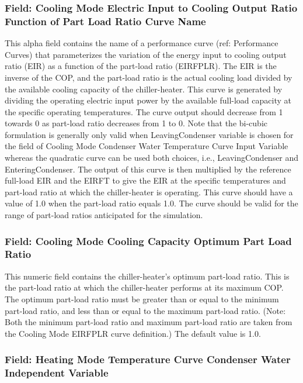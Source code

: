 \subsubsection{Field: Cooling Mode Electric Input to Cooling Output Ratio Function of Part Load Ratio Curve Name}\label{field-cooling-mode-electric-input-to-cooling-output-ratio-function-of-part-load-ratio-curve-name}

This alpha field contains the name of a performance curve (ref: Performance Curves) that parameterizes the variation of the energy input to cooling output ratio (EIR) as a function of the part-load ratio (EIRFPLR). The EIR is the inverse of the COP, and the part-load ratio is the actual cooling load divided by the available cooling capacity of the chiller-heater. This curve is generated by dividing the operating electric input power by the available full-load capacity at the specific operating temperatures. The curve output should decrease from 1 towards 0 as part-load ratio decreases from 1 to 0. Note that the bi-cubic formulation is generally only valid when LeavingCondenser variable is chosen for the field of Cooling Mode Condenser Water Temperature Curve Input Variable whereas the quadratic curve can be used both choices, i.e., LeavingCondenser and EnteringCondenser. The output of this curve is then multiplied by the reference full-load EIR and the EIRFT to give the EIR at the specific temperatures and part-load ratio at which the chiller-heater is operating. This curve should have a value of 1.0 when the part-load ratio equals 1.0. The curve should be valid for the range of part-load ratios anticipated for the simulation.

\subsubsection{Field: Cooling Mode Cooling Capacity Optimum Part Load Ratio}\label{field-cooling-mode-cooling-capacity-optimum-part-load-ratio}

This numeric field contains the chiller-heater's optimum part-load ratio. This is the part-load ratio at which the chiller-heater performs at its maximum COP. The optimum part-load ratio must be greater than or equal to the minimum part-load ratio, and less than or equal to the maximum part-load ratio. (Note: Both the minimum part-load ratio and maximum part-load ratio are taken from the Cooling Mode EIRFPLR curve definition.) The default value is 1.0.

\subsubsection{Field: Heating Mode Temperature Curve Condenser Water Independent Variable}\label{field-heating-mode-temperature-curve-condenser-water-independent-variable}

